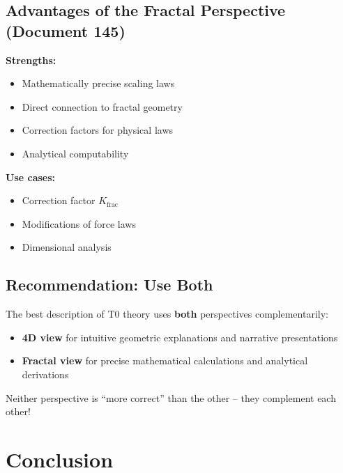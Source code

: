 	\subsection{Advantages of the Fractal Perspective (Document 145)}
	
	\textbf{Strengths:}
	\begin{itemize}
		\item Mathematically precise scaling laws
		\item Direct connection to fractal geometry
		\item Correction factors for physical laws
		\item Analytical computability
	\end{itemize}
	
	\textbf{Use cases:}
	\begin{itemize}
		\item Correction factor $K_{\text{frac}}$
		\item Modifications of force laws
		\item Dimensional analysis
	\end{itemize}
	
	\subsection{Recommendation: Use Both}
	
	\begin{keyresult}
		The best description of T0 theory uses \textbf{both} perspectives complementarily:
		\begin{itemize}
			\item \textbf{4D view} for intuitive geometric explanations and narrative presentations
			\item \textbf{Fractal view} for precise mathematical calculations and analytical derivations
		\end{itemize}
		
		Neither perspective is \enquote{more correct} than the other -- they complement each other!
	\end{keyresult}
	
	\section{Conclusion}
	
